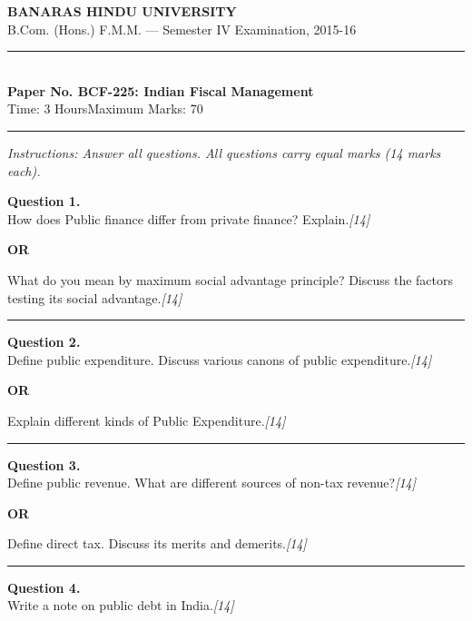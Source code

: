 \documentclass[11pt,a4paper]{article}
\newcommand{\pts}[1]{\hfill   \textit{[#1]}}
\begin{document}
\begin{center}
  {\large\bfseries BANARAS HINDU UNIVERSITY}\\[2pt]
  {\normalsize B.Com. (Hons.) F.M.M. --- Semester IV Examination, 2015-16}\\[6pt]
  \rule{0.8\linewidth}{0.5pt}\\[6pt]
  {\large\bfseries Paper No. BCF-225: Indian Fiscal Management}\\[4pt]
  {\normalsize Time: 3 Hours\hfill Maximum Marks: 70}
\end{center}

\rule{\linewidth}{0.4pt}

\smallskip



\noindent   \textit{Instructions: Answer all questions. All questions carry equal marks (14 marks each).}

\bigskip




\noindent   \textbf{Question 1.} \\
How does Public finance differ from private finance? Explain.\pts{14}

\centerline{   \textbf{OR}}

What do you mean by maximum social advantage principle? Discuss the factors testing its social advantage.\pts{14}

\medskip\rule{\linewidth}{0.2pt}




\noindent   \textbf{Question 2.} \\
Define public expenditure. Discuss various canons of public expenditure.\pts{14}

\centerline{   \textbf{OR}}

Explain different kinds of Public Expenditure.\pts{14}

\medskip\rule{\linewidth}{0.2pt}

\pagebreak




\noindent   \textbf{Question 3.} \\
Define public revenue. What are different sources of non-tax revenue?\pts{14}

\centerline{   \textbf{OR}}

Define direct tax. Discuss its merits and demerits.\pts{14}

\medskip\rule{\linewidth}{0.2pt}




\noindent   \textbf{Question 4.} \\
Write a note on public debt in India.\pts{14}
\end{document}

